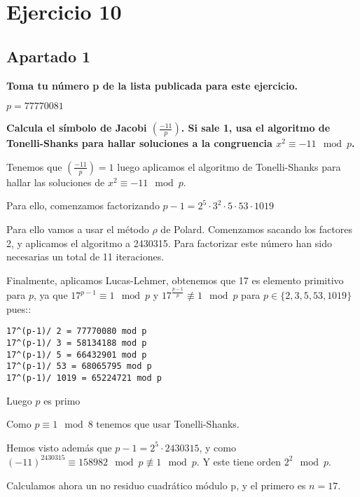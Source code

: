 \documentclass[a4paper]{article}
\title {\fbox{\Huge{\textbf{Ejercicio 10}}}}
\author {\fbox{Ana Buendía Ruiz-Azuaga}}
\begin{document}
\maketitle


\section{Ejercicio 10}

\subsection{Apartado 1}

\textbf{Toma tu número p de la lista publicada para este ejercicio.}

$p = 77770081$

\textbf{Calcula el símbolo de Jacobi $\left( \frac{-11}{p} \right)$. Si sale 1, usa el algoritmo de Tonelli-Shanks para hallar soluciones a la congruencia $x^2 \equiv -11 \mod p$.}

Tenemos que $\left( \frac{-11}{p}\right)=1$ luego aplicamos el algoritmo de Tonelli-Shanks para hallar las soluciones de $x^2\equiv -11\mod p$.

Para ello, comenzamos factorizando $p-1=2^5\cdot 3^2\cdot 5 \cdot 53\cdot 1019$

Para ello vamos a usar el método $\rho$ de Polard. Comenzamos sacando los factores 2, y aplicamos el algoritmo a 2430315. Para factorizar este número han sido necesarias un total de 11 iteraciones.

Finalmente, aplicamos Lucas-Lehmer, obtenemos que 17 es elemento primitivo para $p$, ya que $17^{p-1}\equiv 1\mod p$ y $17^{\frac{p-1}{p}}\not\equiv 1\mod p $ para $p\in\{2,3,5, 53, 1019\}$ pues::

\begin{verbatim}
17^(p-1)/ 2 = 77770080 mod p
17^(p-1)/ 3 = 58134188 mod p
17^(p-1)/ 5 = 66432901 mod p
17^(p-1)/ 53 = 68065795 mod p
17^(p-1)/ 1019 = 65224721 mod p
\end{verbatim}

Luego $p$ es primo

Como $p\equiv 1\mod 8$ tenemos que usar Tonelli-Shanks.

Hemos visto además que $p-1=2^5\cdot 2430315$, y  como $(-11)^{2430315} \equiv 158982 \mod p \not\equiv 1\mod p$.
Y este tiene orden $2^2 \mod p$.

Calculamos ahora un no residuo cuadrático módulo p, y el primero es $n=17$.
\end{document}

